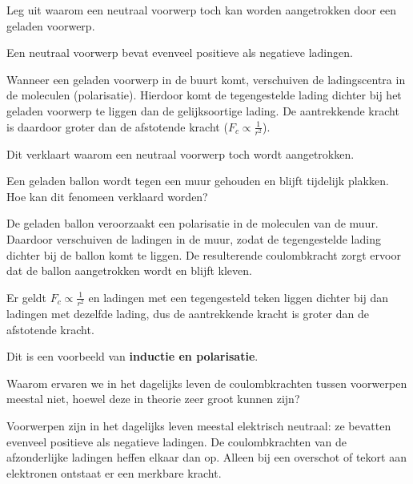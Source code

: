 \documentclass{ximera}
\begin{document}
\begin{question}
    Leg uit waarom een neutraal voorwerp toch kan worden aangetrokken door een geladen voorwerp.

    \begin{solution}\nl
        Een neutraal voorwerp bevat evenveel positieve als negatieve ladingen.

        Wanneer een geladen voorwerp in de buurt komt, verschuiven de ladingscentra in de moleculen (polarisatie). Hierdoor komt de tegengestelde lading dichter bij het geladen voorwerp te liggen dan de gelijksoortige lading. De aantrekkende kracht is daardoor groter dan de afstotende kracht ($F_{c}\propto \tfrac{1}{r^{2}} $).

        Dit verklaart waarom een neutraal voorwerp toch wordt aangetrokken.\\
    \end{solution}
\end{question}

\begin{question}
    Een geladen ballon wordt tegen een muur gehouden en blijft tijdelijk plakken. Hoe kan dit fenomeen verklaard worden?

    \begin{solution}\nl
        De geladen ballon veroorzaakt een polarisatie in de moleculen van de muur. Daardoor verschuiven de ladingen in de muur, zodat de tegengestelde lading dichter bij de ballon komt te liggen. De resulterende coulombkracht zorgt ervoor dat de ballon aangetrokken wordt en blijft kleven.

        Er geldt $F_{c}\propto \tfrac{1}{r^{2}} $ en ladingen met een tegengesteld teken liggen dichter bij dan ladingen met dezelfde lading, dus de aantrekkende kracht is groter dan de afstotende kracht.

        Dit is een voorbeeld van \textbf{inductie en polarisatie}.\\
    \end{solution}
\end{question}

\begin{question}
    Waarom ervaren we in het dagelijks leven de coulombkrachten tussen voorwerpen meestal niet, hoewel deze in theorie zeer groot kunnen zijn?

    \begin{solution}\nl
        Voorwerpen zijn in het dagelijks leven meestal elektrisch neutraal: ze bevatten evenveel positieve als negatieve ladingen. De coulombkrachten van de afzonderlijke ladingen heffen elkaar dan op. Alleen bij een overschot of tekort aan elektronen ontstaat er een merkbare kracht.\\
    \end{solution}
\end{question}
\end{document}
